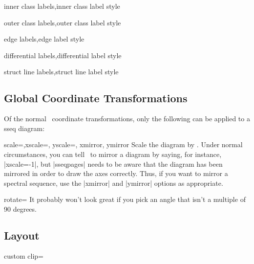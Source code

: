 \documentclass{ltxdoc}
\begin{document}
\begin{sseqdata}[name=ex1,degree={#1}{1-#1}]
\begin{keylist}{inner class labels,inner class label style}

\end{keylist}

\begin{keylist}{outer class labels,outer class label style}

\end{keylist}


\begin{keylist}{edge labels,edge label style}

\end{keylist}

\begin{keylist}{differential labels,differential label style}

\end{keylist}

\begin{keylist}{struct line labels,struct line label style}

\end{keylist}

\subsection{Global Coordinate Transformations}
Of the normal \tikzname\ coordinate transformations, only the following can be applied to a sseq diagram:
\begin{keylist}{scale=,xscale=, yscale=, xmirror, ymirror}
Scale the diagram by . Under normal circumstances, you can tell \tikzname\ to mirror a diagram by saying, for instance, |xscale=-1|, but |sseqpages| needs to be aware that the diagram has been mirrored in order to draw the axes correctly. Thus, if you want to mirror a spectral sequence, use the |xmirror| and |ymirror| options as appropriate.
\end{keylist}

\begin{key}{rotate=}
It probably won't look great if you pick an angle that isn't a multiple of 90 degrees.
\end{key}

\subsection{Layout}
\begin{key}{custom clip=}


\end{key}
\end{sseqdata}
\end{document}
